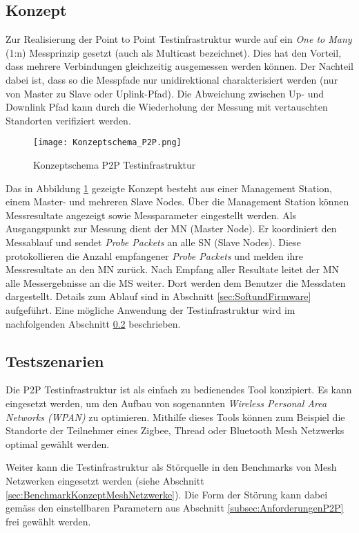 \subsection{Konzept}\label{sec:KonzeptP2P}
Zur Realisierung der Point to Point Testinfrastruktur wurde auf ein \textit{One to Many} (1:n) Messprinzip gesetzt (auch als Multicast bezeichnet). Dies hat den Vorteil, dass mehrere Verbindungen gleichzeitig ausgemessen werden können. Der Nachteil dabei ist, dass so die Messpfade nur unidirektional charakterisiert werden (nur von Master zu Slave oder Uplink-Pfad). Die Abweichung zwischen Up- und Downlink Pfad kann durch die Wiederholung der Messung mit vertauschten Standorten verifiziert werden. 

\begin{figure} [H]
	\centering
	\texttt{[image: Konzeptschema\_P2P.png]}
	\caption{Konzeptschema P2P Testinfrastruktur}
	\label{fig:KonzeptschemaP2P}
\end{figure}


Das in Abbildung \ref{fig:KonzeptschemaP2P} gezeigte Konzept besteht aus einer Management Station, einem Master- und mehreren Slave Nodes.
Über die Management Station können Messresultate angezeigt sowie Messparameter eingestellt werden. Als Ausgangspunkt zur Messung dient der MN (Master Node).
Er koordiniert den Messablauf und sendet \textit{Probe Packets} an alle SN (Slave Nodes).
Diese protokollieren die Anzahl empfangener \textit{Probe Packets} und melden ihre Messresultate an den MN zurück.
Nach Empfang aller Resultate leitet der MN alle Messergebnisse an die MS weiter.
Dort werden dem Benutzer die Messdaten dargestellt.
Details zum Ablauf sind in Abschnitt \ref{sec:SoftundFirmware} aufgeführt.
Eine mögliche Anwendung der Testinfrastruktur wird im nachfolgenden Abschnitt \ref{sec:TestszenarienP2P} beschrieben.  

\subsection{Testszenarien}\label{sec:TestszenarienP2P}
Die P2P Testinfrastruktur ist als einfach zu bedienendes Tool konzipiert.
Es kann eingesetzt werden, um den Aufbau von sogenannten \textit{Wireless Personal Area Networks (WPAN)} zu optimieren.
Mithilfe dieses Tools können zum Beispiel die Standorte der Teilnehmer eines Zigbee, Thread oder Bluetooth Mesh Netzwerks optimal gewählt werden.

Weiter kann die Testinfrastruktur als Störquelle in den Benchmarks von Mesh Netzwerken eingesetzt werden (siehe Abschnitt \ref{sec:BenchmarkKonzeptMeshNetzwerke}).
Die Form der Störung kann dabei gemäss den einstellbaren Parametern aus Abschnitt \ref{subsec:AnforderungenP2P} frei gewählt werden.

